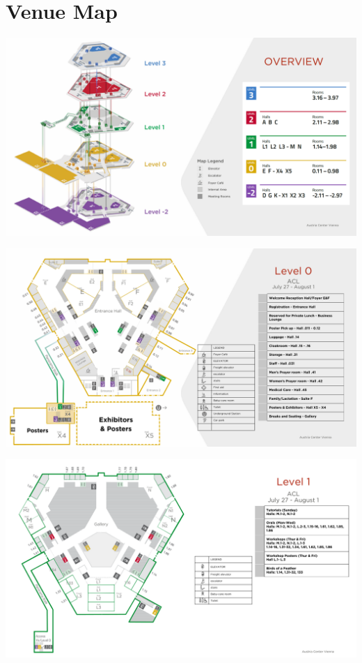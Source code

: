 \chapter{Venue Map}
\vspace*{0.2cm}
\includegraphics[width=1.0\linewidth]{examples/acl25-handbook/venue_map/acl25_map-1.pdf}
\newpage

\vspace*{0.2cm}
\includegraphics[width=1.0\linewidth]{examples/acl25-handbook/venue_map/acl25_map-2.pdf}

\vspace*{0.2cm}
\includegraphics[width=1.0\linewidth]{examples/acl25-handbook/venue_map/acl25_map-3.pdf}
\newpage

